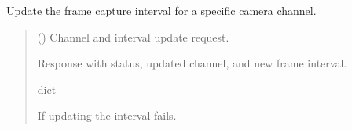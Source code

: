 \documentclass[letterpaper,10pt,english]{sphinxmanual}
\begin{document}
\begin{fulllineitems}
\label{\detokenize{modules/src.data_intake.data_intake.NVRConnection:src.data_intake.data_intake.NVRConnection.set_frame_interval}}
\pysigstartsignatures
\pysiglinewithargsret
{}
{}
{}
\pysigstopsignatures
\sphinxAtStartPar
Update the frame capture interval for a specific camera channel.
\begin{quote}\begin{description}
\sphinxAtStartPar
{} ({\hyperref[\detokenize{modules/src.data_intake.data_intake.NVRConnection:src.data_intake.data_intake.NVRConnection.FrameIntervalRequest}]{}}) \textendash{} Channel and interval update request.

\sphinxAtStartPar
Response with status, updated channel, and new frame interval.

\sphinxAtStartPar
dict

\sphinxAtStartPar
{} \textendash{} If updating the interval fails.

\end{description}\end{quote}

\end{fulllineitems}

\end{document}
